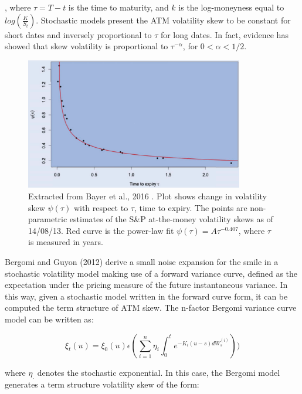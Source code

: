 \documentclass[12pt,oneside]{article}
\begin{document}
, where $\tau = T - t$ is the time to maturity, and $k$ is the log-moneyness equal to $log(\frac{K}{S_{t}})$. Stochastic models present the ATM volatility skew to be constant for short dates and inversely proportional to $\tau$ for long dates. In fact, evidence has showed that skew volatility is proportional to $\tau^{-\alpha}$, for $0<\alpha<1/2$. 

\begin{figure}[htpb]
    \centering
    \includegraphics[width=0.85\textwidth ]{figs/Bayer2016_fig2.png}
    \caption{Extracted from Bayer et al., 2016  \cite[Figure~2]{Bayer2016pricing}. Plot shows change in volatility skew $\psi(\tau)$ with respect to $\tau$, time to expiry. The points are non-parametric estimates of the S&P at-the-money volatility skews as of 14/08/13. Red curve is the power-law fit $\psi(\tau) = A\tau^{−0.407}$, where $\tau$ is measured in years.}
    \label{fig:gatheral_2014_volplots}
\end{figure}

Bergomi and Guyon (2012) derive a small noise expansion for the smile in a stochastic volatility model making use of a forward variance curve, defined as the expectation under the pricing measure of the future instantaneous variance. In this way, given a stochastic model written in the forward curve form, it can be computed the term structure of ATM skew. The n-factor Bergomi variance curve model can be written as:

\begin{equation}
\label{eq:Bergomimodel}
    \xi_{t}(u) = \xi_{0}(u) \epsilon(\sum_{i=1}^{n} \eta_{i} \int_{0}^{t} e^{-K_{i}(u-s) dW_{s}^(i)}))
\end{equation}

where $\eta_{.}$ denotes the stochastic exponential. In this case, the Bergomi model generates a term structure volatility skew of the form:
\end{document}

